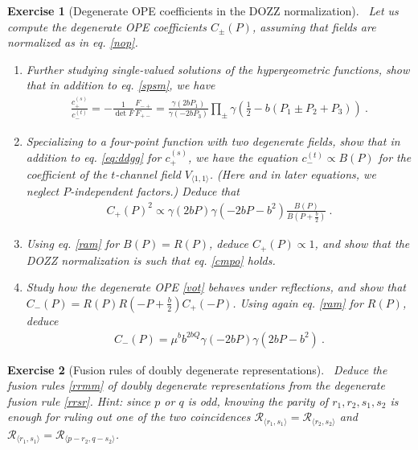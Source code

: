 \documentclass[12pt, a4paper, notitlepage, twoside]{report}
\numberwithin{equation}{section}
\theoremstyle{break}
\newtheorem{exo}{Exercise}[chapter]
\begin{document}
\begin{exo}[Degenerate OPE coefficients in the DOZZ normalization]
 ~\label{exodoc}
 Let us compute the degenerate OPE coefficients $C_\pm(P)$, assuming that fields are normalized as in eq. \eqref{nop}.
\begin{enumerate}
 \item Further studying single-valued solutions of the hypergeometric functions, show that in addition to eq. \eqref{spsm}, we have 
 \begin{align}
  \frac{c_+^{(s)}}{c_-^{(t)}} = -\frac{1}{\det F}\frac{F_{-+}}{F_{+-}} = \frac{\gamma(2bP_1)}{\gamma(-2bP_3)}\prod_\pm \gamma\left(\tfrac12-b(P_1\pm P_2+P_3)\right)\ .
 \end{align}
\item Specializing to a four-point function with two degenerate fields,
show that in addition to eq. \eqref{eq:ddgg} for $c_+^{(s)}$, we have the equation
$
 c_-^{(t)} \propto B(P)
$ for the coefficient of the $t$-channel field $V_{\langle 1,1\rangle}$. 
(Here and in later equations, 
we neglect $P$-independent factors.) Deduce that 
\begin{align}
 C_+(P)^2 \propto \gamma(2bP)\gamma(-2bP-b^2) \frac{B(P)}{B(P+\frac{b}{2})}\ .
\end{align}
\item Using eq. \eqref{ram} for $B(P)=R(P)$, deduce $C_+(P)\propto 1$, and show that the DOZZ normalization is such that eq. \eqref{cmpo} holds. 
\item
Study how the degenerate OPE \eqref{vot} behaves under reflections, and show that $C_-(P) = R(P)R(-P+\frac{b}{2})C_+(-P)$. Using again eq. \eqref{ram} for $R(P)$, deduce
\begin{align}
 C_-(P) = \mu^b b^{2bQ} \gamma(-2bP)\gamma(2bP-b^2)\ .
\end{align}
\end{enumerate}
 \end{exo}


\begin{exo}[Fusion rules of doubly degenerate representations]
 ~\label{exofus}
Deduce the fusion rules \eqref{rrmm} of doubly degenerate representations from the degenerate fusion rule \eqref{rrsr}. 
Hint: since $p$ or $q$ is odd, knowing the parity of $r_1,r_2,s_1,s_2$ is enough for ruling out one of the two coincidences $\mathcal{R}_{\langle r_1,s_1\rangle} = \mathcal{R}_{\langle r_2,s_2\rangle}$ and $\mathcal{R}_{\langle r_1,s_1\rangle} = \mathcal{R}_{\langle p-r_2,q-s_2\rangle}$.
\end{exo}
\end{document}
